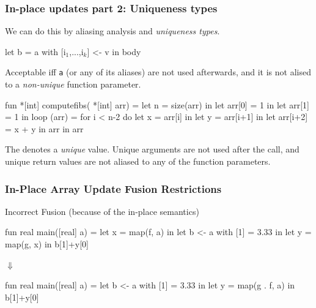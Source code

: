 \documentclass{beamer}
\newcommand{\emp}[1]{\textcolor{DikuRed}{ #1}}
\newcommand{\mymath}[1]{$ #1 $}
\newcommand{\myindx}[1]{_{#1}}
\begin{document}
\begin{frame}[fragile,t]
  \frametitle{In-place updates part 2: Uniqueness types}

  We can do this by aliasing analysis and {\em uniqueness types}.

  \begin{colorcode}
    let b = a with [i\mymath{\myindx{1}},...,i\mymath{\myindx{k}}] <- v
    in body
  \end{colorcode}

  Acceptable iff {\tt a} (or any of its aliases) are not used
  afterwards, and it is not alised to a {\it non-unique} function
  parameter.

  \begin{colorcode}
    fun \emp{*}[int] computefibs(\emp{*}[int] arr) =
      let n = size(arr) in
      let arr[0] = 1 in
      let arr[1] = 1 in
      loop (arr) = for i < n-2 do
        let x = arr[i] in
        let y = arr[i+1] in
        let arr[i+2] = x + y in
        arr
      in arr
  \end{colorcode}

  The {\tt *} denotes a {\em unique} value.  Unique arguments are not
  used after the call, and unique return values are not aliased to any
  of the function parameters.

\end{frame}

\begin{frame}[fragile,t]
  \frametitle{In-Place Array Update Fusion Restrictions}

  \begin{block}{Incorrect Fusion (because of the in-place semantics)}
    \begin{center}
      \begin{colorcode}[fontsize=\scriptsize]
fun real main([real] a) =
let x      = map(f, a)   in
let b <- a with [1] = 3.33 in
let y      = map(g, x)     in
b[1]+y[0]
      \end{colorcode}
      $\Downarrow$
      \begin{colorcode}[fontsize=\scriptsize]
fun real main([real] a) =
let b <- a with [1] = 3.33   in
let y      = map(g . f, a) in
b[1]+y[0]
      \end{colorcode}
    \end{center}
  \end{block}
\end{frame}
\end{document}

